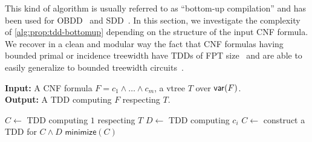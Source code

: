 \documentclass[a4paper,UKenglish,cleveref, autoref, thm-restate]{lipics-v2021}
\begin{document}

This kind of algorithm is usually referred to as ``bottom-up compilation'' and has been used for OBDD~\cite{cudd} and SDD~\cite{Choi_Darwiche_2013}. In this section, we investigate the complexity of \cref{alg:prop:tdd-bottomup} depending on the structure of the input CNF formula. We recover in a clean and modular way the fact that CNF formulas having bounded primal or incidence treewidth have TDDs of FPT size~\cite{BovaCMS15} and are able to easily generalize to bounded treewidth circuits~\cite{BovaS17,AmarilliCMS20}. 

\begin{algorithm}[tp]
  \caption{Bottom-up compilation into TDD.}
  \textbf{Input:} A CNF formula $F = c_1 \wedge \dots \wedge c_m$, a vtree $T$ over $\mathsf{var}(F)$.\\
  \textbf{Output:} A TDD computing $F$ respecting $T$.
  \begin{algorithmic}[1]
    \State $C \gets $ TDD computing $1$ respecting $T$
    \State $D \gets $ TDD computing $c_i$
    \State $C \gets$ construct a TDD for $C \wedge D$
    \State $\mathsf{minimize}(C)$
    \EndFor\\
    \EndProcedure
  \end{algorithmic}
  \label{alg:prop:tdd-bottomup}
\end{algorithm}
\end{document}
